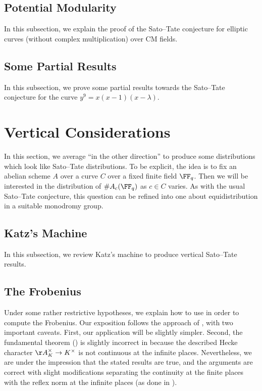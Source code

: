 \documentclass[../thesis.tex]{subfiles}
\begin{document}
\subsection{Potential Modularity}
In this subsection, we explain the proof of the Sato--Tate conjecture for elliptic curves (without complex multiplication) over CM fields.\todo{}

\subsection{Some Partial Results}
In this subsection, we prove some partial results towards the Sato--Tate conjecture for the curve $y^9=x(x-1)(x-\lambda)$.\todo{}

\section{Vertical Considerations}
In this section, we average ``in the other direction'' to produce some distributions which look like Sato--Tate distributions. To be explicit, the idea is to fix an abelian scheme $A$ over a curve $C$ over a fixed finite field $\FF_q$. Then we will be interested in the distribution of $\#A_c(\FF_q)$ as $c\in C$ varies. As with the usual Sato--Tate conjecture, this question can be refined into one about equidistribution in a suitable monodromy group.

\subsection{Katz's Machine}
In this subsection, we review Katz's machine to produce vertical Sato--Tate results.\todo{}

\subsection{The Frobenius}
Under some rather restrictive hypotheses, we explain how to use  in order to compute the Frobenius. Our exposition follows the approach of \cite[Section~4]{van-geeman-fermat-curve-hecke}, with two important caveats. First, our application will be slightly simpler. Second, the fundamental theorem () is slightly incorrect in \cite[Subsection~4.4]{van-geeman-fermat-curve-hecke} because the described Hecke character $\AA_K^\times\to K^\times$ is not continuous at the infinite places. Nevertheless, we are under the impression that the stated results are true, and the arguments are correct with slight modifications separating the continuity at the finite places with the reflex norm at the infinite places (as done in ).
\end{document}
